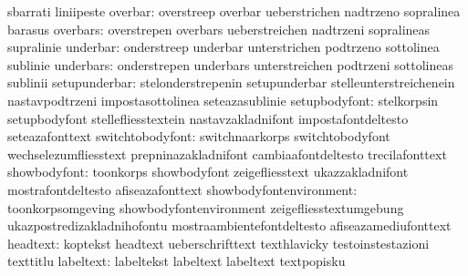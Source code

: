                                   sbarrati                         liniipeste
                         overbar: overstreep                       overbar
                                  ueberstrichen                    nadtrzeno
                                  sopralinea                       barasus
                        overbars: overstrepen                      overbars
                                  ueberstreichen                   nadtrzeni
                                  sopralineas                      supralinie
                        underbar: onderstreep                      underbar
                                  unterstrichen                    podtrzeno
                                  sottolinea                       sublinie
                       underbars: onderstrepen                     underbars
                                  unterstreichen                   podtrzeni
                                  sottolineas                      sublinii
                   setupunderbar: stelonderstrepenin               setupunderbar
                                  stelleunterstreichenein          nastavpodtrzeni
                                  impostasottolinea                seteazasublinie
                   setupbodyfont: stelkorpsin                      setupbodyfont
                                  stellefliesstextein              nastavzakladnifont
                                  impostafontdeltesto              seteazafonttext
                switchtobodyfont: switchnaarkorps                  switchtobodyfont
                                  wechselezumfliesstext            prepninazakladnifont
                                  cambiaafontdeltesto              trecilafonttext
                    showbodyfont: toonkorps                        showbodyfont
                                  zeigefliesstext                  ukazzakladnifont
                                  mostrafontdeltesto               afiseazafonttext
         showbodyfontenvironment: toonkorpsomgeving                showbodyfontenvironment
                                  zeigefliesstextumgebung          ukazpostredizakladnihofontu
                                  mostraambientefontdeltesto       afiseazamediufonttext
                        headtext: koptekst                         headtext
                                  ueberschrifttext                 texthlavicky
                                  testoinstestazioni               texttitlu
                       labeltext: labeltekst                       labeltext
                                  labeltext                        textpopisku
